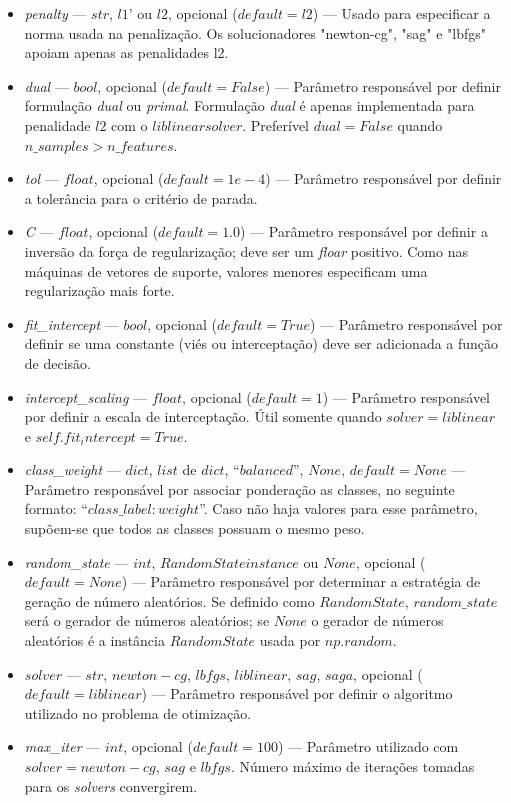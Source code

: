 \documentclass[
	12pt,				%
	oneside,			%
	a4paper,			%
	english,			%
	brazil				%
	]{abntex2ppgsi}
\begin{document}
{{{\begin{apendicesenv}
\begin{itemize}
\item \textit{penalty} --- $str$, $l1’$ ou $l2$, opcional ($default=l2$) --- Usado para especificar a norma usada na penalização. Os solucionadores "newton-cg", "sag" e "lbfgs" apoiam apenas as penalidades l2.
\item \textit{dual} --- $bool$, opcional ($default=False$) --- Parâmetro responsável por definir formulação \textit{dual} ou \textit{primal}. Formulação \textit{dual} é apenas implementada para penalidade $l2$ com o $liblinear solver$. Preferível $dual=False$ quando $n\_samples > n\_features$.
\item \textit{tol} --- $float$, opcional ($default=1e-4$) --- Parâmetro responsável por definir a tolerância para o critério de parada.
\item \textit{C}  --- $float$, opcional ($default=1.0$) --- Parâmetro responsável por definir a inversão da força de regularização; deve ser um \textit{floar} positivo. Como nas máquinas de vetores de suporte, valores menores especificam uma regularização mais forte.
\item \textit{fit\_intercept} --- $bool$, opcional ($default=True$) --- Parâmetro responsável por definir se uma constante (viés ou interceptação) deve ser adicionada a função de decisão.
\item \textit{intercept\_scaling} --- $float$, opcional ($default=1$) --- Parâmetro responsável por definir a escala de interceptação. Útil somente quando $solver=liblinear$ e $self.fit_intercept=True$.
\item \textit{class\_weight} --- $dict$, $list$ de $dict$, ``$balanced$'', $None$, $default=None$ --- Parâmetro responsável por associar ponderação as classes, no seguinte formato: ``${class\_label: weight}$''. Caso não haja valores para esse parâmetro, supõem-se que todos as classes possuam o mesmo peso. 
\item \textit{random\_state} --- $int$, $RandomState instance$ ou $None$, opcional ($default=None$) --- Parâmetro responsável por determinar a estratégia de geração de número aleatórios. Se definido como $RandomState$, $random\_state$ será o gerador de números aleatórios; se $None$ o gerador de números aleatórios é a instância $RandomState$ usada por $np.random$.
\item $solver$ --- $str$, $newton-cg$, $lbfgs$, $liblinear$, $sag$, $saga$, opcional ($default=liblinear$) --- Parâmetro responsável por definir o algoritmo utilizado no problema de otimização.
\item \textit{max\_iter} --- $int$, opcional ($default=100$) --- Parâmetro utilizado com $solver=newton-cg$, $sag$ e $lbfgs$. Número máximo de iterações tomadas para os \textit{solvers} convergirem.

\end{itemize}
\end{apendicesenv}}}}
\end{document}
